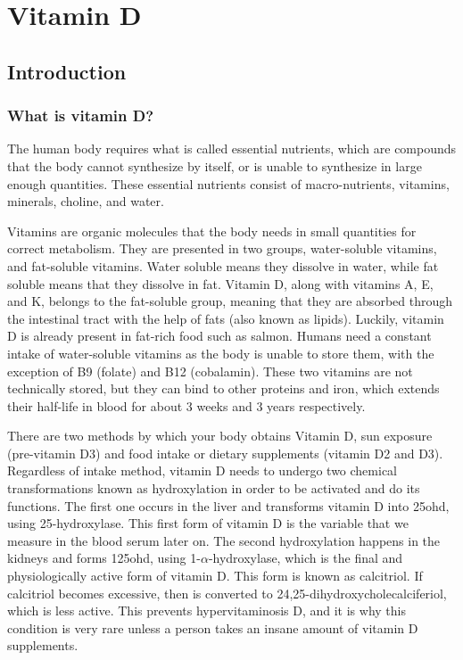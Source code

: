 \chapter{Vitamin D}\label{ch:vitD}

\section{Introduction}

\subsection{What is vitamin D?}

The human body requires what is called essential nutrients, which are compounds that the body cannot synthesize by itself, or is unable to synthesize in large enough quantities. These essential nutrients consist of macro-nutrients, vitamins, minerals, choline, and water.

Vitamins are organic molecules that the body needs in small quantities for correct metabolism. They are presented in two groups, water-soluble vitamins, and fat-soluble vitamins. Water soluble means they dissolve in water, while fat soluble means that they dissolve in fat. Vitamin D, along with vitamins A, E, and K, belongs to the fat-soluble group, meaning that they are absorbed through the intestinal tract with the help of fats (also known as lipids). Luckily, vitamin D is already present in fat-rich food such as salmon. Humans need a constant intake of water-soluble vitamins as the body is unable to store them, with the exception of B9 (folate) and B12 (cobalamin). These two vitamins are not technically stored, but they can bind to other proteins and iron, which extends their half-life in blood for about 3 weeks and 3 years respectively.

There are two methods by which your body obtains Vitamin D, sun exposure (pre-vitamin D3) and food intake or dietary supplements (vitamin D2 and D3). Regardless of intake method, vitamin D needs to undergo two chemical transformations known as hydroxylation in order to be activated and do its functions. The first one occurs in the liver and transforms vitamin D into \gls{25ohd}, using 25-hydroxylase. This first form of vitamin D is the variable that we measure in the blood serum later on. The second hydroxylation happens in the kidneys and forms \gls{125ohd}, using 1-$\alpha$-hydroxylase, which is the final and physiologically active form of vitamin D. This form is known as calcitriol. If calcitriol becomes excessive, then is converted to 24,25-dihydroxycholecalciferiol, which is less active. This prevents hypervitaminosis D, and it is why this condition is very rare unless a person takes an insane amount of vitamin D supplements.

